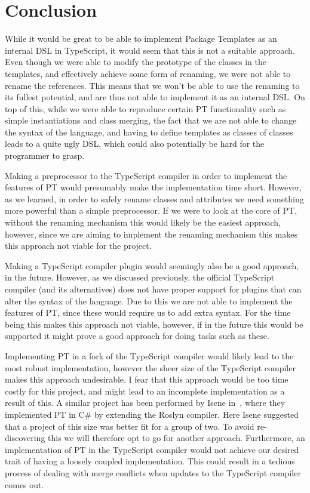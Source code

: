 \section{Conclusion}\label{sec:planning-conclusion}


While it would be great to be able to implement Package Templates as an internal DSL in TypeScript, it would seem that this is not a suitable approach.
Even though we were able to modify the prototype of the classes in the templates, and effectively achieve some form of renaming, we were not able to rename the references.
This means that we won't be able to use the renaming to its fullest potential, and are thus not able to implement it as an internal DSL\@.
On top of this, while we were able to reproduce certain PT functionality such as simple instantiations and class merging, the fact that we are not able to change the syntax of the language, and having to define templates as classes of classes leads to a quite ugly DSL, which could also potentially be hard for the programmer to grasp.

Making a preprocessor to the TypeScript compiler in order to implement the features of PT would presumably make the implementation time short.
However, as we learned, in order to safely rename classes and attributes we need something more powerful than a simple preprocessor.
If we were to look at the core of PT, without the renaming mechanism this would likely be the easiest approach, however, since we are aiming to implement the renaming mechanism this makes this approach not viable for the project.

Making a TypeScript compiler plugin would seemingly also be a good approach, in the future.
However, as we discussed previously, the official TypeScript compiler (and its alternatives) does not have proper support for plugins that can alter the syntax of the language.
Due to this we are not able to implement the features of PT, since these would require us to add extra syntax.
For the time being this makes this approach not viable, however, if in the future this would be supported it might prove a good approach for doing tasks such as these.

Implementing PT in a fork of the TypeScript compiler would likely lead to the most robust implementation, however the sheer size of the TypeScript compiler makes this approach undesirable.
I fear that this approach would be too time costly for this project, and might lead to an incomplete implementation as a result of this.
A similar project has been performed by Isene in~\cite{Isene2018}, where they implemented PT in C\# by extending the Roslyn compiler.
Here Isene suggested that a project of this size was better fit for a group of two.
To avoid re-discovering this we will therefore opt to go for another approach.
Furthermore, an implementation of PT in the TypeScript compiler would not achieve our desired trait of having a loosely coupled implementation.
This could result in a tedious process of dealing with merge conflicts when updates to the TypeScript compiler comes out.

